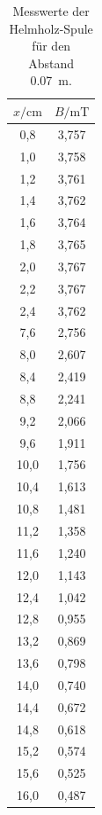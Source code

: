 \begin{table}[H]
  \centering
  \caption{Messwerte der Helmholz-Spule für den Abstand \SI{0.07}{\meter}.}
  \label{tab:3}
  \begin{tabular}{c c}
    \toprule
    $x/\si{\centi\meter}$ & $B/\si{\milli\tesla}$ \\
    \midrule
     0,8 & 3,757 \\
     1,0 & 3,758 \\
     1,2 & 3,761 \\
     1,4 & 3,762 \\
     1,6 & 3,764 \\
     1,8 & 3,765 \\
     2,0 & 3,767 \\
     2,2 & 3,767 \\
     2,4 & 3,762 \\
     7,6 & 2,756 \\
     8,0 & 2,607 \\
     8,4 & 2,419 \\
     8,8 & 2,241 \\
     9,2 & 2,066 \\
     9,6 & 1,911 \\
    10,0 & 1,756 \\
    10,4 & 1,613 \\
    10,8 & 1,481 \\
    11,2 & 1,358 \\
    11,6 & 1,240 \\
    12,0 & 1,143 \\
    12,4 & 1,042 \\
    12,8 & 0,955 \\
    13,2 & 0,869 \\
    13,6 & 0,798 \\
    14,0 & 0,740 \\
    14,4 & 0,672 \\
    14,8 & 0,618 \\
    15,2 & 0,574 \\
    15,6 & 0,525 \\
    16,0 & 0,487 \\
    \bottomrule
  \end{tabular}
\end{table}

